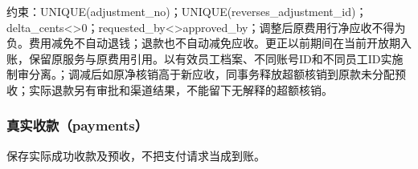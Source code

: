 \documentclass[UTF8,12pt,a4paper,fontset=none]{ctexart}
\begin{document}
约束：UNIQUE(\allowbreak{}adjustment\_\allowbreak{}no)\allowbreak{}；UNIQUE(\allowbreak{}reverses\_\allowbreak{}adjustment\_\allowbreak{}id)\allowbreak{}；delta\_\allowbreak{}cents<\allowbreak{}>\allowbreak{}0；requested\_\allowbreak{}by<\allowbreak{}>\allowbreak{}approved\_\allowbreak{}by；调整后原费用行净应收不得为负。费用减免不自动退钱；退款也不自动减免应收。更正以前期间在当前开放期入账，保留原服务与原费用引用。以有效员工档案、不同账号ID和不同员工ID实施制审分离。；调减后如原净核销高于新应收，同事务释放超额核销到原款未分配预收；实际退款另有审批和渠道结果，不能留下无解释的超额核销。\par
\Needspace{216pt}
\subsubsection{真实收款（payments）}
保存实际成功收款及预收，不把支付请求当成到账。\par
\end{document}
